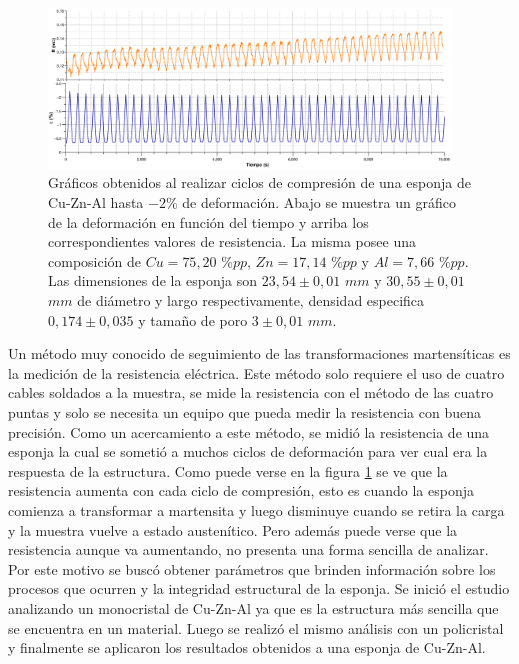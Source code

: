 \documentclass[a4paper,12pt,fleqn,twoside,openany]{book}
\begin{document}
 \begin{figure}
 \centering
 \includegraphics[width=0.95\textwidth]{Img/Resultados/Resistencia/Ciclos.eps}
 \caption{Gráficos obtenidos al realizar ciclos de compresión de una esponja de Cu-Zn-Al hasta $-2\%$ de deformación. Abajo se muestra un gráfico de la deformación en función del tiempo y arriba los correspondientes valores de resistencia. La misma posee una composición de $Cu=75,20$ $\%pp$, $Zn=17,14$ $\%pp$ y $Al=7,66$ $\%pp$. Las dimensiones de la esponja son $23,54 \pm0,01$ $mm$ y $30,55 \pm0,01$ $mm$ de diámetro y largo respectivamente, densidad especifica $0,174 \pm 0,035$ y tamaño de poro $3 \pm 0,01$ $mm$.} 
 \label{fig:CiclosResistencia}
 \end{figure}


 
 
 
 
 Un método muy conocido de seguimiento de las transformaciones martensíticas es la medición de la resistencia eléctrica. Este método solo requiere el uso de cuatro cables soldados a la muestra, se mide la resistencia con el método de las cuatro puntas y solo se necesita un equipo que pueda medir la resistencia con buena precisión. Como un acercamiento a este método, se midió la resistencia de una esponja la cual se sometió a muchos ciclos de deformación para ver cual era la respuesta de la estructura. Como puede verse en la figura \ref{fig:CiclosResistencia} se ve que la resistencia aumenta con cada ciclo de compresión, esto es cuando la esponja comienza a transformar a martensita y luego disminuye cuando se retira la carga y la muestra vuelve a estado austenítico. Pero además puede verse que la resistencia aunque va aumentando, no presenta una forma sencilla de analizar. Por este motivo se buscó obtener parámetros que brinden información sobre los procesos que ocurren y la integridad estructural de la esponja. Se inició el estudio analizando un monocristal de Cu-Zn-Al ya que es la estructura más sencilla que se encuentra en un material. Luego se realizó el mismo análisis con un policristal y finalmente se aplicaron los resultados obtenidos a una esponja de Cu-Zn-Al.
\end{document}
